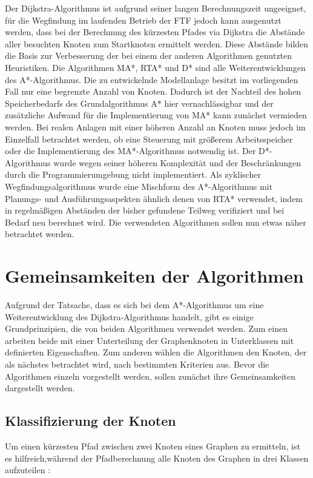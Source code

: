		Der Dijkstra-Algorithmus ist aufgrund seiner langen Berechnungszeit ungeeignet, für die Wegfindung im laufenden Betrieb der \ac{FTF} jedoch kann ausgenutzt werden, dass bei der Berechnung des kürzesten Pfades via Dijkstra die Abstände aller besuchten Knoten zum Startknoten ermittelt werden. Diese Abstände bilden die Basis zur Verbesserung der bei einem der anderen Algorithmen genutzten Heuristiken. Die Algorithmen \ac{MA*}, \ac{RTA*} und \ac{D*} sind alle Weiterentwicklungen des A*-Algorithmus. Die zu entwickelnde Modellanlage besitzt im vorliegenden Fall nur eine begrenzte Anzahl von Knoten. Dadurch ist der Nachteil des hohen Speicherbedarfs des Grundalgorithmus A* hier vernachlässigbar und der zusätzliche Aufwand für die Implementierung von \ac{MA*} kann zunächst vermieden  werden. Bei realen Anlagen mit einer höheren Anzahl an Knoten muss jedoch im Einzelfall betrachtet werden, ob eine Steuerung mit größerem Arbeitsspeicher oder die Implementierung des \ac{MA*}-Algorithmus notwendig ist. Der \ac{D*}-Algorithmus wurde wegen seiner höheren Komplexität und der Beschränkungen durch die Programmierumgebung nicht implementiert. Als zyklischer Wegfindungsalgorithmus wurde eine Mischform des A*-Algorithmus mit Planungs- und Ausführungsaspekten ähnlich denen von \ac{RTA*} verwendet, indem in regelmäßigen Abständen der bisher gefundene Teilweg verifiziert und bei Bedarf neu berechnet wird. Die verwendeten Algorithmen sollen nun etwas näher betrachtet werden.

\section{Gemeinsamkeiten der Algorithmen}

	Aufgrund der Tatsache, dass es sich bei dem A*-Algorithmus um eine Weiterentwicklung des Dijkstra-Algorithmus handelt, gibt es einige Grundprinzipien, die von beiden Algorithmen verwendet werden. Zum einen arbeiten beide mit einer Unterteilung der Graphenknoten in Unterklassen mit definierten Eigenschaften. Zum anderen wählen die Algorithmen den Knoten, der als nächstes betrachtet wird, nach bestimmten Kriterien aus. Bevor die Algorithmen einzeln vorgestellt werden, sollen zunächst ihre Gemeinsamkeiten dargestellt werden.
	
	\subsection{Klassifizierung der Knoten}
		\label{Klassifizierung}
		Um einen kürzesten Pfad zwischen zwei Knoten eines Graphen zu ermitteln, ist es hilfreich,während der Pfadberechnung alle Knoten des Graphen in drei Klassen aufzuteilen \cite{DijkstraAlg}:
		
